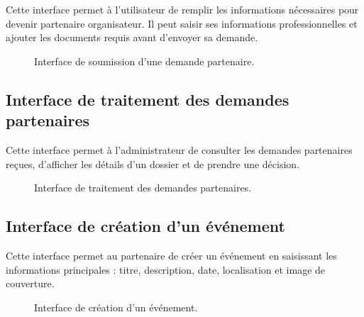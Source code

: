 Cette interface permet à l’utilisateur de remplir les informations nécessaires pour devenir partenaire organisateur. Il peut saisir ses informations professionnelles et ajouter les documents requis avant d’envoyer sa demande.


\begin{figure}[H]
\centering
{}
\caption{Interface de soumission d’une demande partenaire.}
\label{figure:4-8}
\end{figure}


\subsection{Interface de traitement des demandes partenaires}


Cette interface permet à l’administrateur de consulter les demandes partenaires reçues, d’afficher les détails d’un dossier et de prendre une décision.


\begin{figure}[H]
\centering
{}
\caption{Interface de traitement des demandes partenaires.}
\label{figure:4-9}
\end{figure}


\subsection{Interface de création d’un événement}


Cette interface permet au partenaire de créer un événement en saisissant les informations principales : titre, description, date, localisation et image de couverture.


\begin{figure}[H]
\centering
{}
\caption{Interface de création d’un événement.}
\label{figure:4-10}
\end{figure}


